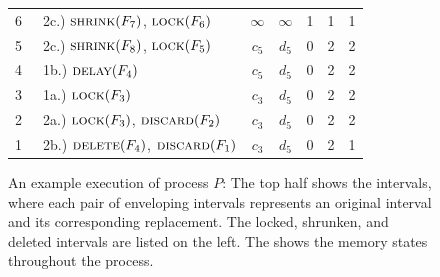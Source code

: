 \begin{figure}
\begin{tabular}{cl|ccccc}
    6 & \ 2c.) $\textsc{shrink}(F_7)$, $\textsc{lock}(F_6)$ & $\infty$ & $\infty$ & 1 & 1 & 1\\
    5 & \ 2c.) $\textsc{shrink}(F_8)$, $\textsc{lock}(F_5)$ & $c_5$ & $d_5$ & 0 & 2 & 2\\
    4 & \ 1b.) $\textsc{delay}(F_4)$ & $c_5$ & $d_5$ & 0 & 2 & 2\\
    3 & \ 1a.) $\textsc{lock}(F_3)$ & $c_3$ & $d_5$ & 0 & 2 & 2\\
    2 & \ 2a.) $\textsc{lock}(F_3)$, $\textsc{discard}(F_2)$ & $c_3$ & $d_5$ & 0 & 2 & 2\\
    1 & \ 2b.) $\textsc{delete}(F_4)$, $\textsc{discard}(F_1)$ & $c_3$ & $d_5$ & 0 & 2 & 1\\
\end{tabular}
\caption{An example execution of process $P$: The top half shows the intervals, where each pair of enveloping intervals represents an original interval and its corresponding replacement. The locked, shrunken, and deleted intervals are listed on the left. The  shows the memory states  throughout the process.}
\label{fig:ham_path}
\end{figure}



